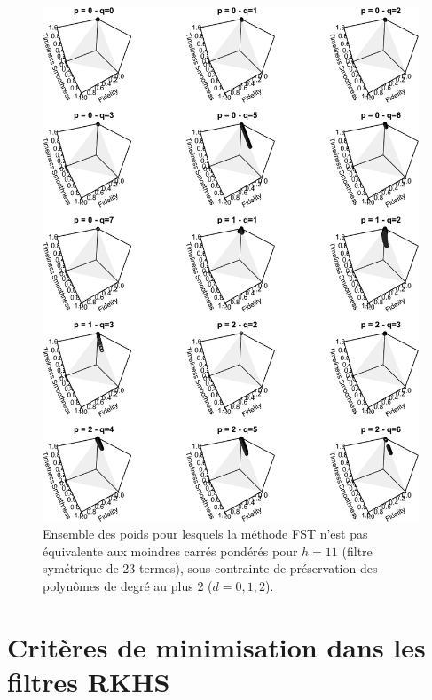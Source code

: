 \documentclass[
  11pt,
  french,
  a4paper]{article}
\newcommand\1{\mathds{1}}
\begin{document}
\begin{figure}[H]

{\centering \includegraphics{img/bookdown/pdf/thhendersonh11d01-1} 

}

\caption[Ensemble des poids pour lesquels la méthode FST n'est pas équivalente aux moindres carrés pondérés pour \(h=11\) (filtre symétrique de 23 termes), sous contrainte de préservation des polynômes de degré au plus 2 (\(d=0,1,2\))]{Ensemble des poids pour lesquels la méthode FST n'est pas équivalente aux moindres carrés pondérés pour \(h=11\) (filtre symétrique de 23 termes), sous contrainte de préservation des polynômes de degré au plus 2 (\(d=0,1,2\)).}\label{fig:thhendersonh11d01}

\footnotesize
\normalsize\end{figure}

\newpage

\hypertarget{an-minrkhs}{%
\section{Critères de minimisation dans les filtres RKHS}\label{an-minrkhs}}
\end{document}
